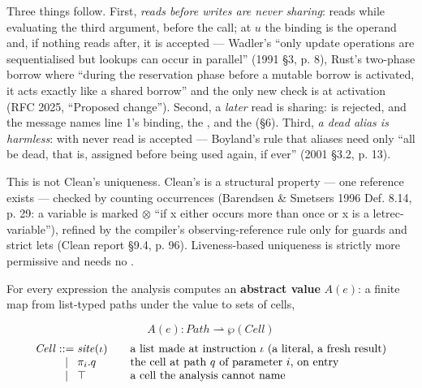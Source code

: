 Three things follow. First, \emph{reads before writes are never sharing}:  reads  while evaluating the third argument, before the call; at $u$ the binding  is the operand and, if nothing reads  after, it is accepted — Wadler's “only update operations are sequentialised but lookups can occur in parallel” (1991 §3, p. 8), Rust's two-phase borrow where “during the reservation phase before a mutable borrow is activated, it acts exactly like a shared borrow” and the only new check is at activation (RFC 2025, “Proposed change”). Second, a \emph{later} read is sharing:  is rejected, and the message names line 1's binding, the , and the  (§6). Third, \emph{a dead alias is harmless}:  with  never read is accepted — Boyland's rule that aliases need only “all be dead, that is, assigned before being used again, if ever” (2001 §3.2, p. 13).

This is not Clean's uniqueness. Clean's \code{*} is a structural property — one reference exists — checked by counting occurrences (Barendsen \& Smetsers 1996 Def. 8.14, p. 29: a variable is marked $\otimes$ “if x either occurs more than once or x is a letrec-variable”), refined by the compiler's observing-reference rule only for guards and strict lets (Clean report §9.4, p. 96). Liveness-based uniqueness is strictly more permissive and needs no .


For every expression the analysis computes an \textbf{abstract value} $A(e)$: a finite map from list-typed paths under the value to sets of cells,

\begin{equation*}
A(e) : \mathit{Path} \rightharpoonup \wp(\mathit{Cell})
\end{equation*}
\begin{equation*}
\begin{array}{@{}r@{\;}c@{\;}l@{\qquad}l@{}}
\mathit{Cell} & ::= & \mathit{site}(\iota) & \text{a list made at instruction } \iota \text{ (a literal, a fresh result)}\\
 & \mid & \pi_i.q & \text{the cell at path } q \text{ of parameter } i\text{, on entry}\\
 & \mid & \top & \text{a cell the analysis cannot name}
\end{array}
\end{equation*}


